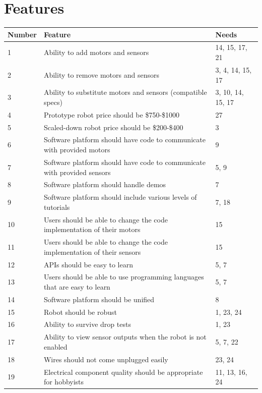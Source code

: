 \documentclass{fank1basedocument}
\begin{document}
\section*{Features}
\begin{center}
	\begin{tabular}{|p{}|p{}|p{}|}
		\hline
		\textbf{Number} & \textbf{Feature} & \textbf{Needs}\\
		\hline
		1 & Ability to add motors and sensors & 14, 15, 17, 21\\
		\hline
		2 & Ability to remove motors and sensors & 3, 4, 14, 15, 17\\
		\hline
		3 & Ability to substitute motors and sensors (compatible specs) & 3, 10, 14, 15, 17\\
		\hline
		4 & Prototype robot price should be \$750-\$1000 & 27\\
		\hline
		5 & Scaled-down robot price should be \$200-\$400 & 3\\
		\hline
		6 & Software platform should have code to communicate with provided motors & 9\\
		\hline
		7 & Software platform should have code to communicate with provided sensors & 5, 9\\
		\hline
		8 & Software platform should handle demos & 7\\
		\hline
		9 & Software platform should include various levels of tutorials & 7, 18\\
		\hline
		10 & Users should be able to change the code implementation of their motors & 15\\
		\hline
		11 & Users should be able to change the code implementation of their sensors & 15\\
		\hline
		12 & APIs should be easy to learn & 5, 7\\
		\hline
		13 & Users should be able to use programming languages that are easy to learn & 5, 7\\
		\hline
		14 & Software platform should be unified & 8\\
		\hline
		15 & Robot should be robust & 1, 23, 24\\
		\hline
		16 & Ability to survive drop tests & 1, 23\\
		\hline
		17 & Ability to view sensor outputs when the robot is not enabled & 5, 7, 22\\
		\hline
		18 & Wires should not come unplugged easily & 23, 24\\
		\hline
		19 & Electrical component quality should be appropriate for hobbyists & 11, 13, 16, 24\\

\end{tabular}
\end{center}
\end{document}
